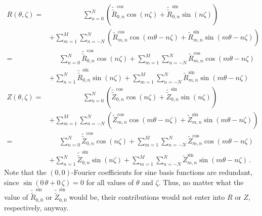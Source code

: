 \begin{align}
    R(\theta, \zeta)
 =& \phantom{+ \sum_{m=1}^{M}}~~\, \sum_{n=0}^{N}
      \left( \tilde{\tilde{R}}_{0,n}^\mathrm{cos} \cos(n \zeta) + \tilde{\tilde{R}}_{0,n}^\mathrm{sin} \sin(n \zeta) \right) \nonumber \\
 ~&          + \sum_{m=1}^{M}   \sum_{n=-N}^{N}
      \left( \tilde{R}_{m,n}^\mathrm{cos} \cos(m \theta - n \zeta) + \tilde{R}_{m,n}^\mathrm{sin} \sin(m \theta - n \zeta) \right) \nonumber \\
 =& \phantom{+}\, \sum_{n=0}^{N}                 \tilde{\tilde{R}}_{0,n}^\mathrm{cos} \cos(n \zeta)
             +    \sum_{m=1}^{M} \sum_{n=-N}^{N} \tilde{R}_{m,n}^\mathrm{cos}         \cos(m \theta - n \zeta) \nonumber \\
 ~&          +    \sum_{n=1}^{N}                 \tilde{\tilde{R}}_{0,n}^\mathrm{sin} \sin(n \zeta)
             +    \sum_{m=1}^{M} \sum_{n=-N}^{N} \tilde{R}_{m,n}^\mathrm{sin}         \sin(m \theta - n \zeta) \label{eqn:fullFourierR} \\
    Z(\theta, \zeta)
 =& \phantom{+ \sum_{m=1}^{M}}~~\, \sum_{n=0}^{N}
      \left( \tilde{\tilde{Z}}_{0,n}^\mathrm{cos} \cos(n \zeta) + \tilde{\tilde{Z}}_{0,n}^\mathrm{sin} \sin(n \zeta) \right) \nonumber \\
 ~&          + \sum_{m=1}^{M}   \sum_{n=-N}^{N}
      \left( \tilde{Z}_{m,n}^\mathrm{cos} \cos(m \theta - n \zeta) + \tilde{Z}_{m,n}^\mathrm{sin} \sin(m \theta - n \zeta) \right) \nonumber \\
 =& \phantom{+}\, \sum_{n=0}^{N}                 \tilde{\tilde{Z}}_{0,n}^\mathrm{cos} \cos(n \zeta)
             +    \sum_{m=1}^{M} \sum_{n=-N}^{N} \tilde{Z}_{m,n}^\mathrm{cos}         \cos(m \theta - n \zeta) \nonumber \\
 ~&          +    \sum_{n=1}^{N}                 \tilde{\tilde{Z}}_{0,n}^\mathrm{sin} \sin(n \zeta)
             +    \sum_{m=1}^{M} \sum_{n=-N}^{N} \tilde{Z}_{m,n}^\mathrm{sin}         \sin(m \theta - n \zeta) \label{eqn:fullFourierZ} \, .
\end{align}
Note that the $(0,0)$-Fourier coefficients for sine basis functions are redundant,
since $\sin(0\, \theta + 0\, \zeta) = 0$ for all values of $\theta$ and $\zeta$.
Thus, no matter what the value of $\tilde{\tilde{R}}_{0,0}^\mathrm{sin}$ or $\tilde{\tilde{Z}}_{0,0}^\mathrm{sin}$ would be,
their contributions would not enter into $R$ or $Z$, respectively, anyway.

\FloatBarrier
\newpage
